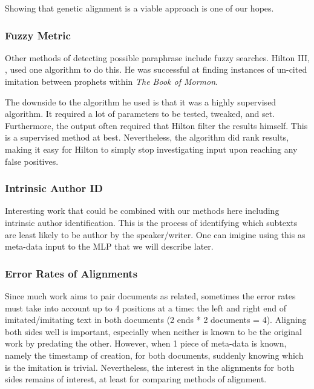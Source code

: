 Showing that genetic alignment is a viable approach is one of our hopes.

\subsubsection{Fuzzy Metric}
Other methods of detecting possible paraphrase include fuzzy searches. Hilton III, \cite{hilton_2012}, used one algorithm to do this. He was successful at finding instances of un-cited imitation between prophets within \textit{The Book of Mormon}.

The downside to the algorithm he used is that it was a highly supervised algorithm. It required a lot of parameters to be tested, tweaked, and set. Furthermore, the output often required that Hilton filter the results himself. This is a supervised method at best. Nevertheless, the algorithm did rank results, making it easy for Hilton to simply stop investigating input upon reaching any false positives.

\subsubsection{Intrinsic Author ID}
Interesting work that could be combined with our methods here including intrinsic author identification. This is the process of identifying which subtexts are least likely to be author by the speaker/writer. One can imigine using this as meta-data input to the MLP that we will describe later.

\subsubsection{Error Rates of Alignments}
Since much work aims to pair documents as related, sometimes the error rates must take into account up to 4 positions at a time: the left and right end of imitated/imitating text in both documents (2 ends * 2 documents = 4). %
Aligning both sides well is important, especially when neither is known to be the original work by predating the other. However, when 1 piece of meta-data is known, namely the timestamp of creation, for both documents, suddenly knowing which is the imitation is trivial. Nevertheless, the interest in the alignments for both sides remains of interest, at least for comparing methods of alignment.
